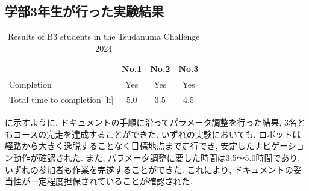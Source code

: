 \subsection{学部3年生が行った実験結果}
\begin{table}[htbp]
  \centering
  \caption{Results of B3 students in the Tsudanuma Challenge 2024}
  \label{tab:b3_results}
  \begin{tabular}{lccc}
    \hline
     & \textbf{No.1} & \textbf{No.2} & \textbf{No.3} \\
    \hline
    Completion & Yes & Yes & Yes \\
    Total time to completion [h] & 5.0 & 3.5 & 4.5 \\
    \hline
  \end{tabular}
\end{table}
に示すように, ドキュメントの手順に沿ってパラメータ調整を行った結果, 3名ともコースの完走を達成することができた. 
いずれの実験においても, ロボットは経路から大きく逸脱することなく目標地点まで走行でき, 安定したナビゲーション動作が確認された. 
また, パラメータ調整に要した時間は3.5〜5.0時間であり, いずれの参加者も作業を完遂することができた. 
これにより, ドキュメントの妥当性が一定程度担保されていることが確認された. 


